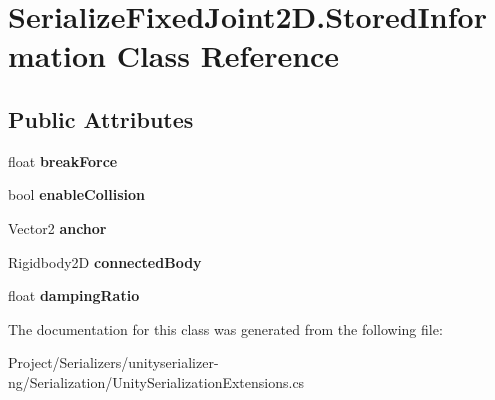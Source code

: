 \hypertarget{class_serialize_fixed_joint2_d_1_1_stored_information}{}\section{Serialize\+Fixed\+Joint2\+D.\+Stored\+Information Class Reference}
\label{class_serialize_fixed_joint2_d_1_1_stored_information}
\subsection*{Public Attributes}
\begin{DoxyCompactItemize}
\item 
\mbox{\label{class_serialize_fixed_joint2_d_1_1_stored_information_aaed8b358b9dca19c939c8d8ab8f0057a}} 
float {\bfseries break\+Force}
\item 
\mbox{\label{class_serialize_fixed_joint2_d_1_1_stored_information_a36d8055ea834af25f36f5a4e0f2d29e2}} 
bool {\bfseries enable\+Collision}
\item 
\mbox{\label{class_serialize_fixed_joint2_d_1_1_stored_information_af97957178a71f91c3f5b04109d727267}} 
Vector2 {\bfseries anchor}
\item 
\mbox{\label{class_serialize_fixed_joint2_d_1_1_stored_information_a02db682e774ec885533c6634e332eead}} 
Rigidbody2D {\bfseries connected\+Body}
\item 
\mbox{\label{class_serialize_fixed_joint2_d_1_1_stored_information_a38dadcba194381edf34f029271c59605}} 
float {\bfseries damping\+Ratio}
\end{DoxyCompactItemize}


The documentation for this class was generated from the following file\+:\begin{DoxyCompactItemize}
\item 
Project/\+Serializers/unityserializer-\/ng/\+Serialization/Unity\+Serialization\+Extensions.\+cs\end{DoxyCompactItemize}
